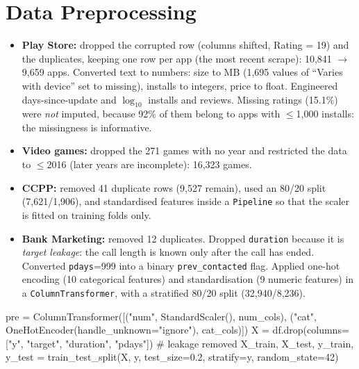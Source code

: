 \section{Data Preprocessing}
\begin{itemize}
\item \textbf{Play Store:} dropped the corrupted row (columns shifted, Rating = 19) and the duplicates, keeping one row
per app (the most recent scrape): 10,841 $\rightarrow$ 9,659 apps. Converted text to numbers: size to MB (1,695 values of
``Varies with device'' set to missing), installs to integers, price to float. Engineered days-since-update and
$\log_{10}$ installs and reviews. Missing ratings (15.1\%) were \emph{not} imputed, because 92\% of them belong to apps
with $\le$1,000 installs: the missingness is informative.
\item \textbf{Video games:} dropped the 271 games with no year and restricted the data to $\le$2016 (later years are
incomplete): 16,323 games.
\item \textbf{CCPP:} removed 41 duplicate rows (9,527 remain), used an 80/20 split (7,621/1,906), and standardised features
inside a \texttt{Pipeline} so that the scaler is fitted on training folds only.
\item \textbf{Bank Marketing:} removed 12 duplicates. Dropped \texttt{duration} because it is \emph{target leakage}: the
call length is known only after the call has ended. Converted \texttt{pdays}=999 into a binary
\texttt{prev\_contacted} flag. Applied one-hot encoding (10 categorical features) and standardisation (9 numeric
features) in a \texttt{ColumnTransformer}, with a stratified 80/20 split (32,940/8,236).
\end{itemize}
\begin{pycode}
pre = ColumnTransformer([("num", StandardScaler(), num_cols),
                         ("cat", OneHotEncoder(handle_unknown="ignore"), cat_cols)])
X = df.drop(columns=["y", "target", "duration", "pdays"])      # leakage removed
X_train, X_test, y_train, y_test = train_test_split(X, y, test_size=0.2, stratify=y, random_state=42)
\end{pycode}

